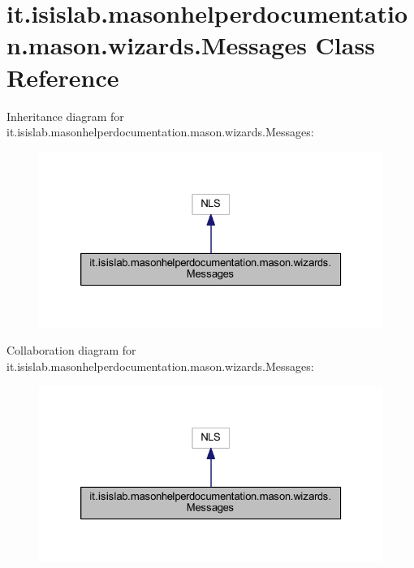 \hypertarget{classit_1_1isislab_1_1masonhelperdocumentation_1_1mason_1_1wizards_1_1_messages}{\section{it.\-isislab.\-masonhelperdocumentation.\-mason.\-wizards.\-Messages Class Reference}
\label{classit_1_1isislab_1_1masonhelperdocumentation_1_1mason_1_1wizards_1_1_messages}
}


Inheritance diagram for it.\-isislab.\-masonhelperdocumentation.\-mason.\-wizards.\-Messages\-:\nopagebreak
\begin{figure}[H]
\begin{center}
\leavevmode
\includegraphics[width=326pt]{classit_1_1isislab_1_1masonhelperdocumentation_1_1mason_1_1wizards_1_1_messages__inherit__graph}
\end{center}
\end{figure}


Collaboration diagram for it.\-isislab.\-masonhelperdocumentation.\-mason.\-wizards.\-Messages\-:\nopagebreak
\begin{figure}[H]
\begin{center}
\leavevmode
\includegraphics[width=326pt]{classit_1_1isislab_1_1masonhelperdocumentation_1_1mason_1_1wizards_1_1_messages__coll__graph}
\end{center}
\end{figure}
